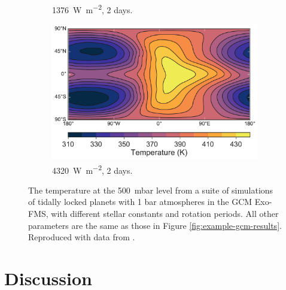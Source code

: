 \begin{figure}
\begin{subfigure}[b]{0.32\textwidth}
        \caption{\SI{1376}{\watt\per\metre\squared}, 2 days.}
        \label{fig:spherical-low-omega}
      \end{subfigure}
      \begin{subfigure}[b]{0.32\textwidth}
        \includegraphics[width=\textwidth]{figures/wave-mean-flow/ar_highT_2day.pdf}
        \caption{\SI{4320}{\watt\per\metre\squared}, 2 days.}
        \label{fig:spherical-high-omega}
        \end{subfigure}
  \caption{The temperature at the \SI{500}{\milli\bar} level from a suite of simulations of tidally locked planets with 1 bar atmospheres in the GCM Exo-FMS, with different stellar constants and rotation periods. All other parameters are the same as those in Figure \ref{fig:example-gcm-results}. Reproduced with data from \citet{pierrehumbert2018review}.}
  \label{fig:gcm-suite-temperature}
\end{figure}




\section{Discussion}\label{sec:shift-mechanism}


